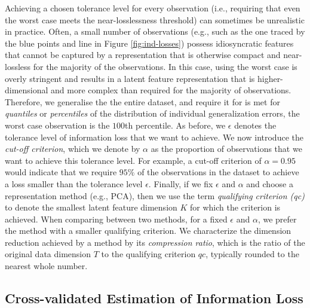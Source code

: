 Achieving a chosen tolerance level for every observation (i.e., requiring that even the worst case meets the near-losslessness threshold) can sometimes be unrealistic in practice.
Often, a small number of observations (e.g., such as the one traced by the blue points and line in Figure \ref{fig:ind-losses}) possess idiosyncratic features that cannot be captured by a representation that is otherwise compact and near-lossless for the  majority of the observations.
In this case, using the worst case is overly stringent and results in a latent feature representation that is higher-dimensional and more complex than required for the  majority of observations.
Therefore, we generalise the  the entire dataset, and require it for is met for \emph{quantiles} or \emph{percentiles} of the distribution of individual generalization errors,  the worst case observation is the $100$th percentile. 
As before, we $\epsilon$ denotes the tolerance level of information loss that we want to achieve.
We now introduce the \emph{cut-off criterion}, which we denote by $\alpha$ as the proportion of observations that we want to achieve this tolerance level.
For example, a cut-off criterion of $\alpha = 0.95$ would indicate that we require $95\%$ of the observations in the dataset to achieve a loss smaller than the tolerance level $\epsilon$.
Finally, if we fix $\epsilon$ and $\alpha$ and choose a representation method (e.g., PCA), then we use the term \emph{qualifying criterion (qc)} to denote the smallest latent feature dimension $K$ for which the criterion is achieved.
When comparing between two methods, for a fixed $\epsilon$ and $\alpha$, we prefer the method with a smaller qualifying criterion.
We characterize the dimension reduction achieved by a method by its \emph{compression ratio}, which is the ratio of the original data dimension $T$ to the qualifying criterion $qc$, typically rounded to the nearest whole number.

\subsection{Cross-validated Estimation of Information Loss}

